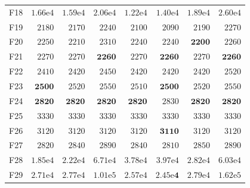 \begin{tabular}{lrrrrrrr}
F18 & $1.66\mathrm{e}{4}$ & $1.59\mathrm{e}{4}$ & $2.06\mathrm{e}{4}$ & $1.22\mathrm{e}{4}$ & $1.40\mathrm{e}{4}$ & $1.89\mathrm{e}{4}$ & $2.60\mathrm{e}{4}$ \\
F19 & $2180$ & $2170$ & $2240$ & $2100$ & $2090$ & $2190$ & $2270$ \\
F20 & $2250$ & $2210$ & $2310$ & $2240$ & $2240$ & $\mathbf{2200}$ & $2260$ \\
F21 & $2270$ & $2270$ & $\mathbf{2260}$ & $2270$ & $\mathbf{2260}$ & $2270$ & $\mathbf{2260}$ \\
F22 & $2410$ & $2420$ & $2450$ & $2420$ & $2420$ & $2420$ & $2520$ \\
F23 & $\mathbf{2500}$ & $2520$ & $2550$ & $2510$ & $\mathbf{2500}$ & $2520$ & $2550$ \\
F24 & $\mathbf{2820}$ & $\mathbf{2820}$ & $\mathbf{2820}$ & $\mathbf{2820}$ & $2830$ & $\mathbf{2820}$ & $\mathbf{2820}$ \\
F25 & $3330$ & $3330$ & $3330$ & $3330$ & $3330$ & $3330$ & $3330$ \\
F26 & $3120$ & $3120$ & $3120$ & $3120$ & $\mathbf{3110}$ & $3120$ & $3120$ \\
F27 & $2820$ & $2840$ & $2890$ & $2840$ & $2810$ & $2850$ & $2890$ \\
F28 & $1.85\mathrm{e}{4}$ & $2.22\mathrm{e}{4}$ & $6.71\mathrm{e}{4}$ & $3.78\mathrm{e}{4}$ & $3.97\mathrm{e}{4}$ & $2.82\mathrm{e}{4}$ & $6.03\mathrm{e}{4}$ \\
F29 & $2.71\mathrm{e}{4}$ & $2.77\mathrm{e}{4}$ & $1.01\mathrm{e}{5}$ & $2.57\mathrm{e}{4}$ & $\mathbf{2.45\mathrm{e}{4}}$ & $2.79\mathrm{e}{4}$ & $1.62\mathrm{e}{5}$ \\
\bottomrule
\end{tabular}
